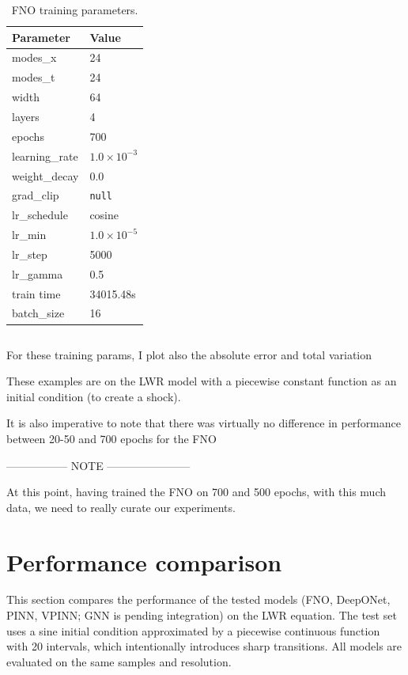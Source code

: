 \documentclass[11pt,a4paper]{article}
\begin{document}
\begin{table}[h]
\centering
\begin{tabular}{ll}
\hline
Parameter & Value \\
\hline
modes\_x & 24 \\
modes\_t & 24 \\
width & 64 \\
layers & 4 \\
epochs & 700 \\
learning\_rate & $1.0 \times 10^{-3}$ \\
weight\_decay & 0.0 \\
grad\_clip & \texttt{null} \\
lr\_schedule & cosine \\
lr\_min & $1.0 \times 10^{-5}$ \\
lr\_step & 5000 \\
lr\_gamma & 0.5 \\
train time & 34015.48s \\
batch\_size & 16 \\
\hline
\end{tabular}
\caption{FNO training parameters.}
\end{table}

\begin{table}[h]
\centering
\begin{tabular}{ll}
\hline
\end{tabular}
\end{table}


For these training params, I plot also the absolute error and total variation 

These examples are on the LWR model with a piecewise constant function as an initial condition (to create a shock). 

It is also imperative to note that there was virtually no difference in performance between 20-50 and 700 epochs for the FNO

----------------- NOTE -----------------------

At this point, having trained the FNO on 700 and 500 epochs, with this much data, we need to really curate our experiments.


\section{Performance comparison}

This section compares the performance of the tested models (FNO, DeepONet, PINN, VPINN; GNN is pending integration) on the LWR equation. The test set uses a sine initial condition approximated by a piecewise continuous function with 20 intervals, which intentionally introduces sharp transitions. All models are evaluated on the same samples and resolution.
\end{document}
